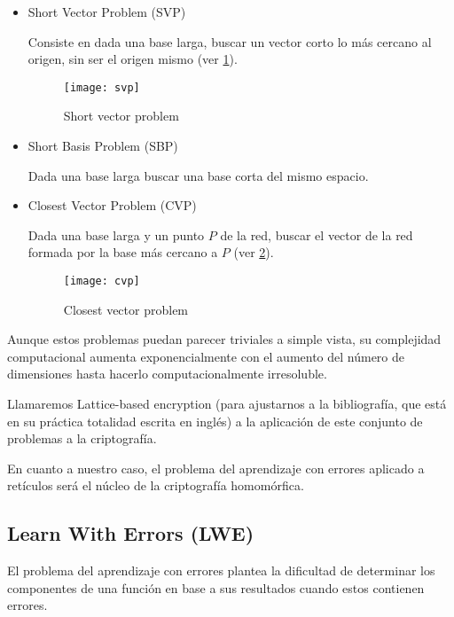 \begin{itemize}
  \item Short Vector Problem (SVP)

  Consiste en dada una base larga, buscar un vector corto lo más cercano al origen, sin ser el origen mismo (ver \ref{fig:svp}).

  \begin{figure}[h]
    \caption{Short vector problem \cite{wikipedia_contributors._lattice_2019}}
    \label{fig:svp}
    \texttt{[image: svp]}
  \end{figure}

  \item Short Basis Problem (SBP)

  Dada una base larga buscar una base corta del mismo espacio.

  \item Closest Vector Problem (CVP)

  Dada una base larga y un punto $P$ de la red, buscar el vector de la red formada por la base más cercano a $P$ (ver \ref{fig:cvp}).

  \begin{figure}[h]
    \caption{Closest vector problem \cite{wikipedia_contributors._lattice_2019}}
    \label{fig:cvp}
    \texttt{[image: cvp]}
  \end{figure}


\end{itemize}

Aunque estos problemas puedan parecer triviales a simple vista, su complejidad computacional aumenta exponencialmente con el aumento del número de dimensiones hasta hacerlo computacionalmente irresoluble.

Llamaremos Lattice-based encryption (para ajustarnos a la bibliografía, que está en su práctica totalidad escrita en inglés) a la aplicación de este conjunto de problemas a la criptografía.

En cuanto a nuestro caso, el problema del aprendizaje con errores aplicado a retículos será el núcleo de la criptografía homomórfica.

\subsection{Learn With Errors (LWE)}

El problema del aprendizaje con errores plantea la dificultad de determinar los componentes de una función en base a sus resultados cuando estos contienen errores\cite{apon_intro_nodate}.

